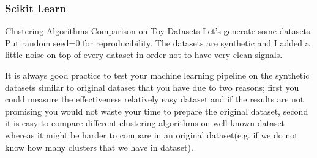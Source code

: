 \begin{frame}[fragile]
	\frametitle{Scikit Learn}
Clustering Algorithms Comparison on Toy Datasets
Let's generate some datasets. Put random seed=0 for reproducibility. The datasets are synthetic and I added a little noise on top of every dataset in order not to have very clean signals.

It is always good practice to test your machine learning pipeline on the synthetic datasets similar to original dataset that you have due to two reasons; first you could measure the effectiveness relatively easy dataset and if the results are not promising you would not waste your time to prepare the original dataset, second it is easy to compare different clustering algorithms on well-known dataset whereas it might be harder to compare in an original dataset(e.g. if we do not know how many clusters that we have in dataset).
\end{frame}
